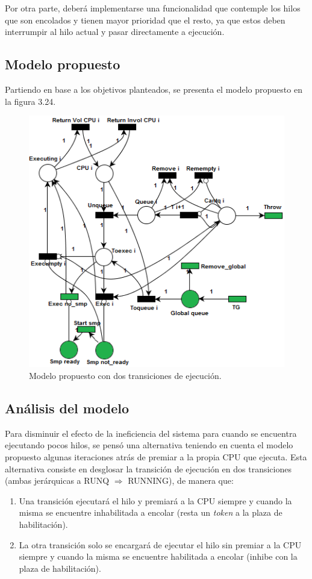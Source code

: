 \documentclass[a4paper]{book}
\begin{document}
Por otra parte, deber\'a implementarse una funcionalidad que contemple los hilos que son encolados y tienen mayor prioridad que el resto, ya que estos deben interrumpir al hilo actual y pasar directamente a ejecuci\'on.

\subsection{Modelo propuesto}
Partiendo en base a los objetivos planteados, se presenta el modelo propuesto en la figura 3.24.

\begin{figure} [H]
	\begin{center}
	    \includegraphics[scale=0.95]{./imagenes/it12modelored.png}
		\caption{Modelo propuesto con dos transiciones de ejecuci\'on.}
	\end{center}
\end{figure}

\subsection{An\'alisis del modelo}
Para disminuir el efecto de la ineficiencia del sistema para cuando se encuentra ejecutando pocos hilos, se pens\'o una alternativa teniendo en cuenta el modelo propuesto algunas iteraciones atr\'as de premiar a la propia CPU que ejecuta. Esta alternativa consiste en desglosar la transici\'on de ejecuci\'on en dos transiciones (ambas jer\'arquicas a RUNQ $\Rightarrow$ RUNNING), de manera que:
\begin{enumerate}
\item Una transici\'on ejecutar\'a el hilo y premiar\'a a la CPU siempre y cuando la misma se encuentre inhabilitada a encolar (resta un \emph{token} a la plaza de habilitaci\'on).
\item La otra transici\'on solo se encargar\'a de ejecutar el hilo sin premiar a la CPU siempre y cuando la misma se encuentre habilitada a encolar (inhibe con la plaza de habilitaci\'on).
\end{enumerate}
\end{document}
